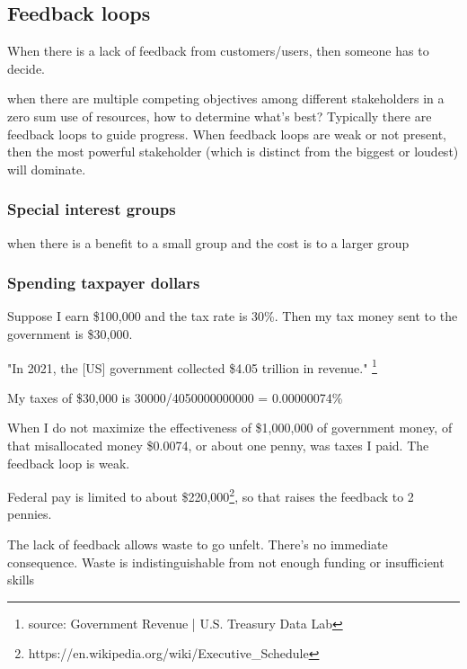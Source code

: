 \subsection{Feedback loops}

When there is a lack of feedback from customers/users, then someone has to decide.


when there are multiple competing objectives among different stakeholders in a zero sum use of resources, how to determine what's best? Typically there are feedback loops to guide progress. When feedback loops are weak or not present, then the most powerful stakeholder (which is distinct from the biggest or loudest) will dominate. 

\subsubsection{Special interest groups}

when there is a benefit to a small group and the cost is to a larger group

\subsubsection{Spending taxpayer dollars}

Suppose I earn \$100,000 and the tax rate is 30\%. Then my tax money sent to the government is \$30,000.

"In 2021, the [US] government collected \$4.05 trillion in revenue."
\footnote{source: Government Revenue | U.S. Treasury Data Lab}

My taxes of \$30,000 is
30000/4050000000000 = 0.00000074\%

When I do not maximize the effectiveness of \$1,000,000 of government money, of that misallocated money \$0.0074, or about one penny, was taxes I paid. The feedback loop is weak.

Federal pay is limited to about \$220,000\footnote{https://en.wikipedia.org/wiki/Executive\_Schedule}, so that raises the feedback to 2 pennies.

The lack of feedback allows waste to go unfelt. There's no immediate consequence.
Waste is indistinguishable from not enough funding or insufficient skills 




